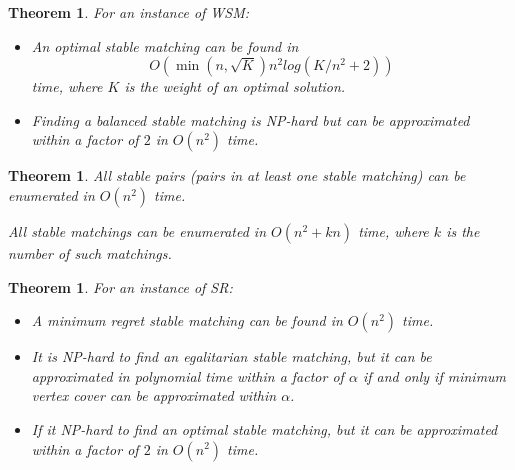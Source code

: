\documentclass{article}
\newtheorem{theorem}[fact]{Theorem}
\begin{document}
\begin{theorem}
For an instance of WSM:
\begin{itemize}
\item An optimal stable matching can be found in $$O(\min(n,\sqrt{K})n^2log(K/n^2 + 2))$$ time, where $K$ is the weight of an optimal solution.
\item Finding a balanced stable matching is NP-hard but can be approximated within a factor of $2$ in $O(n^2)$ time.
\end{itemize}
\end{theorem}
\begin{theorem}
\item All stable pairs (pairs in at least one stable matching) can be enumerated in $O(n^2)$ time.
\item All stable matchings can be enumerated in $O(n^2 + kn)$ time, where $k$ is the number of such matchings.
\end{theorem}
\begin{theorem}
For an instance of SR:
\begin{itemize}
\item A minimum regret stable matching can be found in $O(n^2)$ time.
\item It is NP-hard to find an egalitarian stable matching, but it can be approximated in polynomial time within a factor of $\alpha$ if and only if minimum vertex cover can be approximated within $\alpha$.
\item If it NP-hard to find an optimal stable matching, but it can be approximated within a factor of $2$ in $O(n^2)$ time.
\end{itemize}
\end{theorem}


\end{document}

